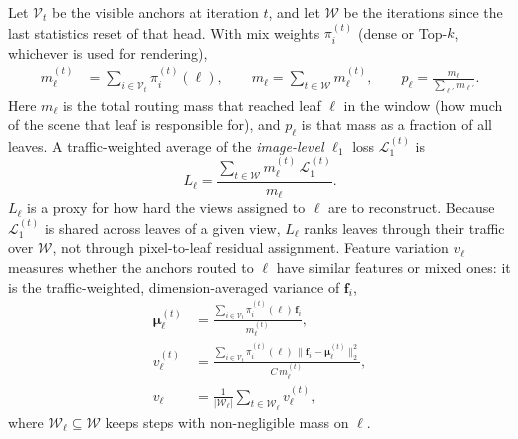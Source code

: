 Let $\mathcal{V}_t$ be the visible anchors at iteration $t$, and let $\mathcal{W}$ be the iterations since the last statistics reset of that head.
With mix weights $\pi_i^{(t)}$ (dense or Top-$k$, whichever is used for rendering),
\begin{equation}
\begin{aligned}
m_{\ell}^{(t)}
&=
\sum_{i\in\mathcal{V}_t}\pi_i^{(t)}(\ell),
\qquad
m_{\ell}
=
\sum_{t\in\mathcal{W}}m_{\ell}^{(t)},
\qquad
p_{\ell}
=
\frac{m_{\ell}}{\sum_{\ell'}m_{\ell'}}.
\end{aligned}
\label{eq:traffic}
\end{equation}
Here $m_{\ell}$ is the total routing mass that reached leaf $\ell$ in the window (how much of the scene that leaf is responsible for),
and $p_{\ell}$ is that mass as a fraction of all leaves.
A traffic-weighted average of the \emph{image-level} $\ell_1$ loss $\mathcal{L}_{1}^{(t)}$ is
\begin{equation}
L_{\ell}
=
\frac{\sum_{t\in\mathcal{W}}m_{\ell}^{(t)}\,\mathcal{L}_{1}^{(t)}}{m_{\ell}}.
\label{eq:leaf-loss}
\end{equation}
$L_{\ell}$ is a proxy for how hard the views assigned to $\ell$ are to reconstruct.
Because $\mathcal{L}_{1}^{(t)}$ is shared across leaves of a given view, $L_{\ell}$ ranks leaves through their traffic over $\mathcal{W}$, not through pixel-to-leaf residual assignment.
Feature variation $v_{\ell}$ measures whether the anchors routed to $\ell$ have similar features or mixed ones: it is the traffic-weighted, dimension-averaged variance of $\mathbf{f}_i$,
\begin{equation}
\begin{aligned}
\boldsymbol{\mu}_{\ell}^{(t)}
&=
\frac{\sum_{i\in\mathcal{V}_t}\pi_i^{(t)}(\ell)\,\mathbf{f}_i}{m_{\ell}^{(t)}},
\\
v_{\ell}^{(t)}
&=
\frac{\sum_{i\in\mathcal{V}_t}\pi_i^{(t)}(\ell)\,
\|\mathbf{f}_i-\boldsymbol{\mu}_{\ell}^{(t)}\|_{2}^{2}}{C\,m_{\ell}^{(t)}},
\\
v_{\ell}
&=
\frac{1}{|\mathcal{W}_{\ell}|}\sum_{t\in\mathcal{W}_{\ell}}v_{\ell}^{(t)},
\end{aligned}
\label{eq:leaf-variance}
\end{equation}
where $\mathcal{W}_{\ell}\subseteq\mathcal{W}$ keeps steps with non-negligible mass on $\ell$.

